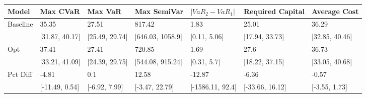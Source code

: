 \begin{tabular}{lllllll}
\toprule
   Model &       Max CVaR &        Max VaR &      Max SemiVar & $|VaR_2 - VaR_1|$ & Required Capital &   Average Cost \\
\midrule
Baseline &          35.35 &          27.51 &           817.42 &              1.83 &            25.01 &          36.29 \\
         & [31.87, 40.17] & [25.49, 29.74] & [646.03, 1058.9] &      [0.11, 5.06] &   [17.94, 33.73] & [32.85, 40.46] \\
     Opt &          37.41 &          27.41 &           720.85 &              1.69 &             27.6 &          36.73 \\
         & [33.21, 41.09] & [24.39, 29.75] & [544.08, 915.24] &       [0.31, 5.7] &   [18.22, 37.15] & [33.05, 40.68] \\
Pct Diff &          -4.81 &            0.1 &            12.58 &            -12.87 &            -6.36 &          -0.57 \\
         & [-11.49, 0.54] &  [-6.92, 7.99] &   [-3.47, 22.79] &  [-1586.11, 92.4] &  [-33.66, 16.12] &  [-3.55, 1.73] \\
\bottomrule
\end{tabular}
